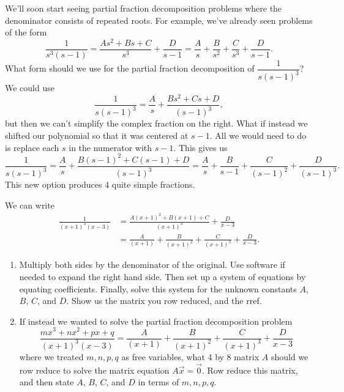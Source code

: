  








 



We'll soon start seeing partial fraction decomposition problems where the denominator consists of repeated roots.  For example, we've already seen problems of the form 
$$\dfrac{1}{s^3(s-1)} 
= \dfrac{As^2+Bs+C}{s^3}+\dfrac{D}{s-1} 
= \frac{A}{s}+\frac{B}{s^2}+\frac{C}{s^3}+\frac{D}{s-1}.$$
What form should we use for the partial fraction decomposition of $\dfrac{1}{s(s-1)^3}$?  We could use
$$
\dfrac{1}{s(s-1)^3} 
= \dfrac{A}{s}+\dfrac{Bs^2+Cs+D}{(s-1)^3}, 
$$
but then we can't simplify the complex fraction on the right.  What if instead we shifted our polynomial so that it was centered at $s-1$.  All we would need to do is replace each $s$ in the numerator with $s-1$.  This gives us
$$
\dfrac{1}{s(s-1)^3} 
= \dfrac{A}{s}+\dfrac{B(s-1)^2+C(s-1)+D}{(s-1)^3} 
= \dfrac{A}{s}+\dfrac{B}{s-1}+\dfrac{C}{(s-1)^2}+\dfrac{D}{(s-1)^3}. 
$$
This new option produces 4 quite simple fractions.





\begin{problem}
We can write 
\begin{align*}
\frac{1}{(x+1)^3(x-3)}
&=\frac{A(x+1)^2+B(x+1)+C}{(x+1)^3}+\frac{D}{x-3} \\
&=
\frac{A}{(x+1)}
+\frac{B}{(x+1)^2}
+\frac{C}{(x+1)^3}
+\frac{D}{x-3} . 
\end{align*}
\begin{enumerate}
 \item 
Multiply both sides by the denominator of the original. 
Use software if needed to expand the right hand side. 
Then set up a system of equations by equating coefficients. 
Finally, solve this system for the unknown constants $A$, $B$, $C$, and $D$. Show us the matrix you row reduced, and the rref.
 \item 
If instead we wanted to solve the partial fraction decomposition problem
$$\frac{mx^3+nx^2+px+q}{(x+1)^3(x-3)} = 
\frac{A}{(x+1)}
+\frac{B}{(x+1)^2}
+\frac{C}{(x+1)^3}
+\frac{D}{x-3}$$
where we treated $m,n,p,q$ as free variables, what 4 by 8 matrix $A$ should we row reduce to solve the matrix equation $A\vec x = \vec 0$. Row reduce this matrix, and then state $A$, $B$, $C$, and $D$ in terms of $m,n,p,q$. 
\end{enumerate}

\end{problem}















